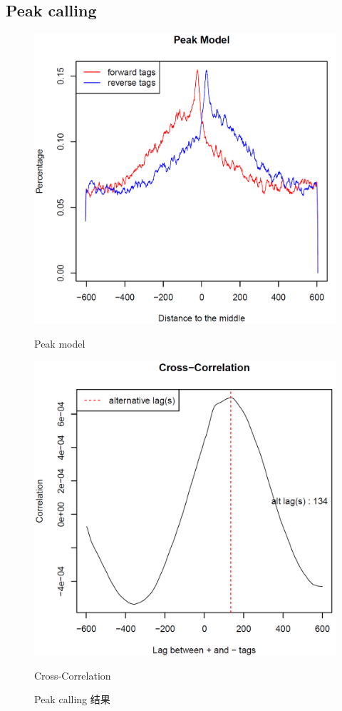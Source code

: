 \documentclass[UTF8]{ctexart}
\begin{document}
\subsection{Peak calling}
\begin{figure}[h]
	\begin{minipage}{0.45\linewidth}
		\centerline{\includegraphics[width=\textwidth]{img/peak_model.png}}
		\centerline{Peak model}
	\end{minipage}
	\begin{minipage}{0.45\linewidth}
		\centerline{\includegraphics[width=\textwidth]{img/cross_correlation.png}}
		\centerline{Cross-Correlation}
\end{minipage}
\caption{Peak calling 结果}
\end{figure}
\end{document}
